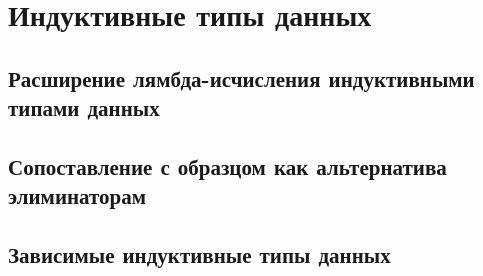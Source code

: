\section{Индуктивные типы данных}

\subsection{Расширение лямбда-исчисления индуктивными типами данных}

\subsection{Сопоставление с образцом как альтернатива элиминаторам}

\subsection{Зависимые индуктивные типы данных}
